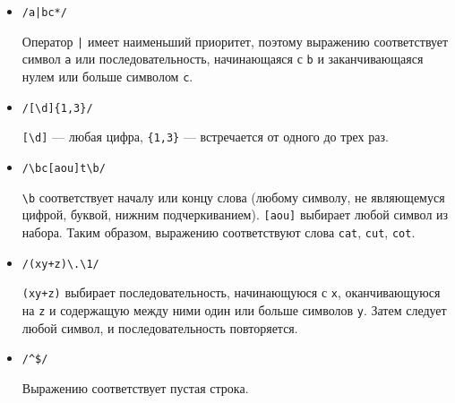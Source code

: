 \documentclass[listings]{labreport}
\begin{document}
\begin{itemize}
\item \verb=/a|bc*/=

Оператор \verb=|= имеет наименьший приоритет, поэтому выражению соответствует
символ \texttt{a} или последовательность, начинающаяся с \texttt{b} и заканчивающаяся
нулем или больше символом \texttt{c}.

\item \verb=/[\d]{1,3}/=

\verb|[\d]| — любая цифра, \verb|{1,3}| — встречается от одного до трех раз.

\item \verb=/\bc[aou]t\b/=

\verb|\b| соответствует началу или концу слова (любому символу, не являющемуся
цифрой, буквой, нижним подчеркиванием). \verb|[aou]| выбирает любой символ из набора.
Таким образом, выражению соответствуют слова \texttt{cat}, \texttt{cut}, \texttt{cot}.

\item \verb=/(xy+z)\.\1/=

\verb|(xy+z)| выбирает последовательность, начинающуюся с \texttt{x}, оканчивающуюся
на \texttt{z} и содержащую между ними один или больше символов \texttt{y}. Затем
следует любой символ, и последовательность повторяется.

\item \verb=/^$/=

Выражению соответствует пустая строка.

\end{itemize}
\end{document}
